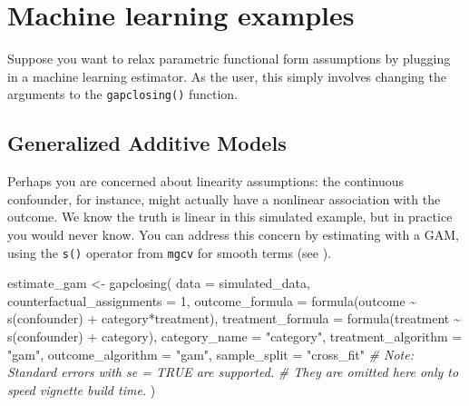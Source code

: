 \documentclass[
]{article}
\newenvironment{Shaded}{\begin{snugshade}}{\end{snugshade}}
\newcommand{\AttributeTok}[1]{\textcolor[rgb]{0.77,0.63,0.00}{#1}}
\newcommand{\CommentTok}[1]{\textcolor[rgb]{0.56,0.35,0.01}{\textit{#1}}}
\newcommand{\DecValTok}[1]{\textcolor[rgb]{0.00,0.00,0.81}{#1}}
\newcommand{\FunctionTok}[1]{\textcolor[rgb]{0.00,0.00,0.00}{#1}}
\newcommand{\NormalTok}[1]{#1}
\newcommand{\OtherTok}[1]{\textcolor[rgb]{0.56,0.35,0.01}{#1}}
\newcommand{\SpecialCharTok}[1]{\textcolor[rgb]{0.00,0.00,0.00}{#1}}
\newcommand{\StringTok}[1]{\textcolor[rgb]{0.31,0.60,0.02}{#1}}
\begin{document}
\hypertarget{machine-learning-examples}{%
\section{Machine learning examples}\label{machine-learning-examples}}

Suppose you want to relax parametric functional form assumptions by plugging in a machine learning estimator. As the user, this simply involves changing the arguments to the \texttt{gapclosing()} function.

\hypertarget{generalized-additive-models}{%
\subsection{Generalized Additive Models}\label{generalized-additive-models}}

Perhaps you are concerned about linearity assumptions: the continuous confounder, for instance, might actually have a nonlinear association with the outcome. We know the truth is linear in this simulated example, but in practice you would never know. You can address this concern by estimating with a GAM, using the \texttt{s()} operator from \texttt{mgcv} for smooth terms (see \citet{mgcv}).

\begin{Shaded}
\begin{Highlighting}[]
\NormalTok{estimate\_gam }\OtherTok{\textless{}{-}} \FunctionTok{gapclosing}\NormalTok{(}
  \AttributeTok{data =}\NormalTok{ simulated\_data,}
  \AttributeTok{counterfactual\_assignments =} \DecValTok{1}\NormalTok{,}
  \AttributeTok{outcome\_formula =} \FunctionTok{formula}\NormalTok{(outcome }\SpecialCharTok{\textasciitilde{}} \FunctionTok{s}\NormalTok{(confounder) }\SpecialCharTok{+}\NormalTok{ category}\SpecialCharTok{*}\NormalTok{treatment),}
  \AttributeTok{treatment\_formula =} \FunctionTok{formula}\NormalTok{(treatment }\SpecialCharTok{\textasciitilde{}} \FunctionTok{s}\NormalTok{(confounder) }\SpecialCharTok{+}\NormalTok{ category),}
  \AttributeTok{category\_name =} \StringTok{"category"}\NormalTok{,}
  \AttributeTok{treatment\_algorithm =} \StringTok{"gam"}\NormalTok{,}
  \AttributeTok{outcome\_algorithm =} \StringTok{"gam"}\NormalTok{,}
  \AttributeTok{sample\_split =} \StringTok{"cross\_fit"}
  \CommentTok{\# Note: Standard errors with \textasciigrave{}se = TRUE\textasciigrave{} are supported.}
  \CommentTok{\# They are omitted here only to speed vignette build time.}
\NormalTok{)}
\end{Highlighting}
\end{Shaded}
\end{document}
